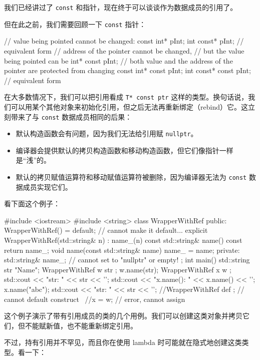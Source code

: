 我们已经讲过了 \texttt{const} 和指针，现在终于可以谈谈作为数据成员的引用了。

但在此之前，我们需要回顾一下 \texttt{const} 指针：

\begin{codebox}[cpp]
// value being pointed cannot be changed:
const int* pInt;
int const* pInt; // equivalent form
// address of the pointer cannot be changed,
// but the value being pointed can be
int* const pInt;
// both value and the address of the pointer are protected from changing
const int* const pInt;
int const* const pInt; // equivalent form
\end{codebox}

在大多数情况下，我们可以把引用看成 \texttt{T* const ptr} 这样的类型。换句话说，我们可以用某个其他对象来初始化引用，但之后无法再重新绑定（rebind）它。这立刻带来了与 \texttt{const} 数据成员相同的后果：

\begin{itemize}
\item 默认构造函数会有问题，因为我们无法给引用赋 \texttt{nullptr}。
\item 编译器会提供默认的拷贝构造函数和移动构造函数，但它们像指针一样是“浅”的。
\item 默认的拷贝赋值运算符和移动赋值运算符被删除，因为编译器无法为 \texttt{const} 数据成员实现它们。
\end{itemize}

看下面这个例子：

\begin{codebox}[cpp]
#include <iostream>
#include <string>
class WrapperWithRef {
public:
WrapperWithRef() = default; // cannot make it default...
explicit WrapperWithRef(std::string& n) : name_(n) { }
const std::string& name() const { return name_; }
void name(const std::string& name) { name_ = name; }
private:
std::string& name_; // cannot set to "nullptr" or {} empty!
};
int main() {
std::string str { "Name"};
WrapperWithRef w { str };
w.name(str);
WrapperWithRef x { w };
std::cout << "str:
" << str << '\n';
std::cout << "x.name(): " << x.name() << '\n';
x.name("abc");
std::cout << "str:
" << str << '\n';
//WrapperWithRef def {}; // cannot default construct
\
//x = w; // error, cannot assign
}
\end{codebox}

这个例子演示了带有引用成员的类的几个用例。我们可以创建这类对象并拷贝它们，但不能赋新值，也不能重新绑定引用。

不过，持有引用并不罕见，而且你在使用 lambda 时可能就在隐式地创建这类类型。看一下：

